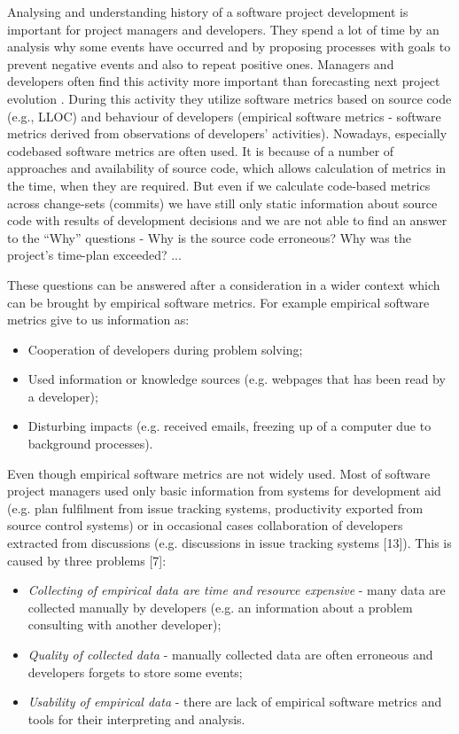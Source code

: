 \documentclass[18px,a4, conference]{IEEEtran}
\begin{document}
Analysing and understanding history of a software project development is important for project managers and developers. They spend a lot of time by an analysis why some events have occurred and by proposing processes with goals to prevent negative events and also to repeat positive ones. Managers and developers often ﬁnd this activity more important than forecasting next project evolution \cite{buse2012information}      %
. During this activity they utilize software metrics based on source code (e.g., LLOC) and behaviour of developers (empirical software metrics - software metrics derived from observations of developers’ activities). Nowadays, especially codebased software metrics are often used. It is because of a number of approaches and availability of source code, which allows calculation of metrics in the time, when they are required. But even if we calculate code-based metrics across change-sets (commits) we have still only static information about source code with results of development decisions and we are not able to ﬁnd an answer to the “Why” questions - Why is the source code erroneous? Why was the project’s time-plan exceeded? ...

These questions can be answered after a consideration in a wider context which can be brought by empirical software metrics. For example empirical software metrics give to us information as:

\begin{itemize}						%
\item  Cooperation of developers during problem solving;
\item Used information or knowledge sources (e.g. webpages that has been read by a developer);
\item Disturbing impacts (e.g. received emails, freezing up of a computer due to background processes).
\end{itemize}

 Even though empirical software metrics are not widely used. Most of software project managers used only basic information from systems for development aid (e.g. plan fulﬁlment from issue  
 tracking systems, productivity exported from source control systems) or in occasional cases collaboration of developers extracted from discussions (e.g. discussions in issue tracking systems [13]). This is caused by three problems [7]:
\begin{itemize}
\item \textit{Collecting of empirical data are time and resource expensive} - many data are collected manually by developers (e.g. an information about a problem consulting with another developer);
\item \textit{Quality of collected data} - manually collected data are often erroneous and developers forgets to store some events;
\item \textit{Usability of empirical data} - there are lack of empirical software metrics and tools for their interpreting and analysis.
\end{itemize}
\end{document}
